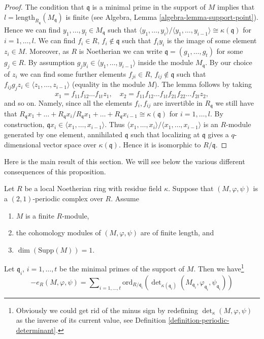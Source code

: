 \begin{proof}
The condition that $\mathfrak q$ is a minimal prime in the support
of $M$ implies that $l = \text{length}_{R_\mathfrak q}(M_\mathfrak q)$
is finite (see Algebra, Lemma \ref{algebra-lemma-support-point}).
Hence we can find $y_1, \ldots, y_l \in M_{\mathfrak q}$
such that
$\langle y_1, \ldots, y_i\rangle / \langle y_1, \ldots, y_{i - 1}\rangle
\cong \kappa(\mathfrak q)$ for $i = 1, \ldots, l$.
We can find $f_i \in R$, $f_i \not \in \mathfrak q$ such that
$f_i y_i$ is the image of some element $z_i \in M$.
Moreover, as $R$ is Noetherian we can write
$\mathfrak q = (g_1, \ldots, g_t)$ for some $g_j \in R$.
By assumption $g_j y_i \in \langle y_1, \ldots, y_{i - 1} \rangle$
inside the module $M_{\mathfrak q}$.
By our choice of $z_i$ we can find some further elements
$f_{ji} \in R$, $f_{ij} \not \in \mathfrak q$ such that
$f_{ij} g_j z_i \in \langle z_1, \ldots, z_{i - 1} \rangle$
(equality in the module $M$).
The lemma follows by taking
$$
x_1 = f_{11}f_{12}\ldots f_{1t}z_1,
\quad
x_2 = f_{11}f_{12}\ldots f_{1t}f_{21}f_{22}\ldots f_{2t}z_2,
$$
and so on. Namely, since all the elements $f_i, f_{ij}$ are invertible
in $R_{\mathfrak q}$ we still have that
$R_{\mathfrak q}x_1 + \ldots + R_{\mathfrak q}x_i /
R_{\mathfrak q}x_1 + \ldots + R_{\mathfrak q}x_{i - 1}
\cong \kappa(\mathfrak q)$ for $i = 1, \ldots, l$.
By construction, $\mathfrak q x_i \in \langle x_1, \ldots, x_{i - 1}\rangle$.
Thus $\langle x_1, \ldots, x_i\rangle / \langle x_1, \ldots, x_{i - 1}\rangle$
is an $R$-module generated by one element, annihilated $\mathfrak q$
such that localizing at $\mathfrak q$ gives a $q$-dimensional
vector space over $\kappa(\mathfrak q)$.
Hence it is isomorphic to $R/\mathfrak q$.
\end{proof}

\noindent
Here is the main result of this section.
We will see below the various different
consequences of this proposition.

\begin{proposition}
\label{proposition-length-determinant-periodic-complex}
Let $R$ be a local Noetherian ring with residue field $\kappa$.
Suppose that $(M, \varphi, \psi)$ is a $(2, 1)$-periodic
complex over $R$. Assume
\begin{enumerate}
\item $M$ is a finite $R$-module,
\item the cohomology modules of $(M, \varphi, \psi)$ are of finite length, and
\item $\dim(\text{Supp}(M)) = 1$.
\end{enumerate}
Let $\mathfrak q_i$, $i = 1, \ldots, t$ be the minimal
primes of the support of $M$. Then we have\footnote{
Obviously we could get rid of the minus sign by redefining
$\det_\kappa(M, \varphi, \psi)$ as the inverse of its
current value, see Definition \ref{definition-periodic-determinant}.}
$$
- e_R(M, \varphi, \psi) =
\sum\nolimits_{i = 1, \ldots, t}
\text{ord}_{R/\mathfrak q_i}\left(
\det\nolimits_{\kappa(\mathfrak q_i)}
(M_{\mathfrak q_i}, \varphi_{\mathfrak q_i}, \psi_{\mathfrak q_i})
\right)
$$
\end{proposition}

